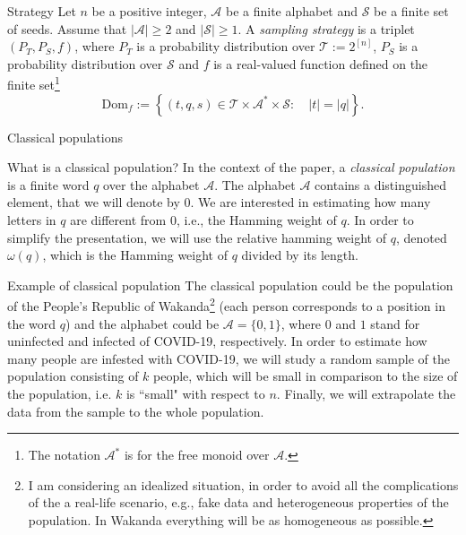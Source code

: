 \documentclass{beamer}
\begin{document}
\begin{frame}{Strategy}
Let $n$ be a positive integer, $\mathcal{A}$ be a finite alphabet and $\mathcal{S}$ be a finite set of seeds. Assume that $|\mathcal{A}| \geq 2$ and $|\mathcal{S}| \geq 1$. A \emph{sampling strategy} is a triplet $\left( P_T, P_S, f \right)$, where $P_T$ is a probability distribution over $\mathcal{T} := 2^{[n]}$, $P_S$ is a probability distribution over $\mathcal{S}$ and $f$ is a real-valued function defined on the finite set\footnote{The notation $\mathcal{A}^{\ast}$ is for the free monoid over $\mathcal{A}$.}
$$
\textrm{Dom}_f := \left\{ (t, q, s)\in \mathcal{T}\times \mathcal{A}^{\ast} \times \mathcal{S}: \quad |t| = |q| \right\}.
$$
\end{frame}

\begin{frame}
\begin{center}
\Large{Classical populations}
\end{center}
\end{frame}

\begin{frame}{What is a classical population?} 
In the context of the paper, a \emph{classical population} is a finite word $q$ over the alphabet $\mathcal{A}$. The alphabet $\mathcal{A}$ contains a distinguished element, that we will denote by $0$. We are interested in estimating how many letters in $q$ are different from $0$, i.e., the Hamming weight of $q$. In order to simplify the presentation, we will use the relative hamming weight of $q$, denoted $\omega(q)$, which is the Hamming weight of $q$ divided by its length.
\end{frame}

\begin{frame}{Example of classical population} 
The classical population could  be the population of the People's Republic of Wakanda\footnote{I am considering an idealized situation, in order to avoid all the complications of the a real-life scenario, e.g., fake data and heterogeneous properties of the population. In Wakanda everything will be as homogeneous as possible.} (each person corresponds to a position in the word $q$) and the alphabet could be $\mathcal{A} = \{0, 1\}$, where $0$ and $1$ stand for  uninfected and infected of COVID-19, respectively. In order to estimate how many people are infested with COVID-19, we will study a random sample of the population consisting of $k$ people, which will be small in comparison to the size of the population, i.e. $k$ is ``small" with respect to $n$. Finally, we will extrapolate the data from the sample to the whole population.
\end{frame}
\end{document}
